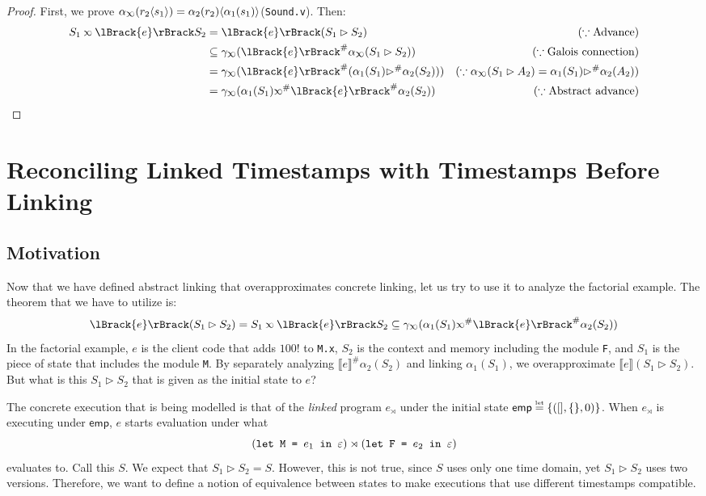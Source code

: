 \documentclass[acmsmall,screen,review]{acmart}\settopmatter{printfolios=true,printccs=false,printacmref=false}
\theoremstyle{acmdefinition}
\newcommand*{\Abs}[1]{{#1}^{\#}}
\newcommand*{\texteq}[1]{\stackrel{\mathclap{\tiny\normalfont\mbox{#1}}}{=}}
\newcommand*{\synlink}{\rtimes}
\newcommand*{\semlink}{\mathbin{\rotatebox[origin=c]{180}{$\propto$}}}
\newcommand*{\mt}{\mathsf{emp}}
\newcommand*{\sembracket}[1]{\lBrack{#1}\rBrack}
\newcommand*{\inject}[2]{{#2}\langle{#1}\rangle}
\begin{document}
\begin{proof}
  First, we prove $\alpha_{\semlink}(\inject{s_1}{r_2})=\inject{\alpha_1(s_1)}{\alpha_2(r_2)}$(\texttt{Sound.v}). Then:
  \begin{align*}
    S_1\semlink\sembracket{e}S_2 & =\sembracket{e}(S_1\rhd S_2)                                                   & (\because\text{Advance})                                                    \\
                                 & \subseteq\gamma_{\semlink}(\Abs{\sembracket{e}}\alpha_{\semlink}(S_1\rhd S_2)) & (\because\text{Galois connection})                                          \\
                                 & =\gamma_{\semlink}(\Abs{\sembracket{e}}(\alpha_1(S_1)\Abs\rhd\alpha_2(S_2)))   & (\because\alpha_{\semlink}(S_1\rhd A_2)=\alpha_1(S_1)\Abs\rhd\alpha_2(A_2)) \\
                                 & =\gamma_{\semlink}(\alpha_1(S_1)\Abs\semlink\Abs{\sembracket{e}}\alpha_2(S_2)) & (\because\text{Abstract advance})
  \end{align*}
\end{proof}
\section{Reconciling Linked Timestamps with Timestamps Before Linking}
\subsection{Motivation}
Now that we have defined abstract linking that overapproximates concrete linking, let us try to use it to analyze the factorial example.
The theorem that we have to utilize is:
\[\sembracket{e}(S_1\rhd S_2)=S_1\semlink\sembracket{e}S_2\subseteq\gamma_{\semlink}(\alpha_1(S_1)\Abs\semlink\Abs{\sembracket{e}}\alpha_2(S_2))\]
In the factorial example, $e$ is the client code that adds $100!$ to \texttt{M.x}, $S_2$ is the context and memory including the module \texttt{F}, and $S_1$ is the piece of state that includes the module \texttt{M}.
By separately analyzing $\Abs{\sembracket{e}}\alpha_2(S_2)$ and linking $\alpha_1(S_1)$, we overapproximate $\sembracket{e}(S_1\rhd S_2)$.
But what is this $S_1\rhd S_2$ that is given as the initial state to $e$?

The concrete execution that is being modelled is that of the \emph{linked} program $e_{\synlink}$ under the initial state $\mt\texteq{let}\{([],\{\},0)\}$.
When $e_\synlink$ is executing under $\mt$, $e$ starts evaluation under what
  {\small\[(\text{\texttt{let M = }}e_1\text{\texttt{ in }}\varepsilon)\synlink(\text{\texttt{let F = }}e_2\text{\texttt{ in }}\varepsilon)\]}%
evaluates to.
Call this $S$.
We expect that $S_1\rhd S_2=S$.
However, this is not true, since $S$ uses only one time domain, yet $S_1\rhd S_2$ uses two versions.
Therefore, we want to define a notion of equivalence between states to make executions that use different timestamps compatible.
\end{document}
